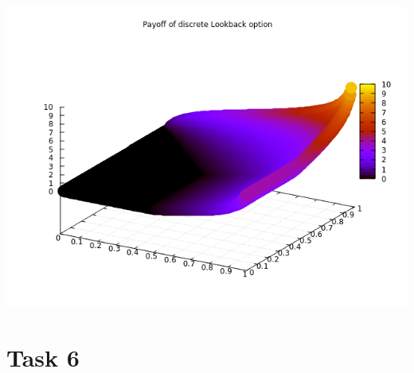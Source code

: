 \documentclass[10pt,a4paper]{article}
\begin{document}
\begin{center}
	\includegraphics[scale=0.4]{payoff_lookback.png}
\end{center}

\section*{Task 6}
\end{document}
